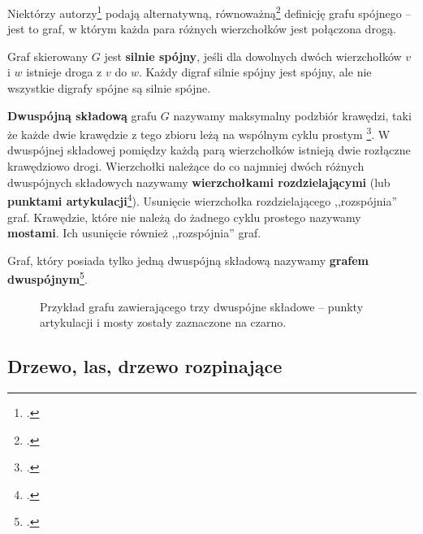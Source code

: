 Niektórzy autorzy\footcite[342]{ross} podają alternatywną, równoważną\footcite[42]{wilson} definicję grafu spójnego -- jest to graf, w którym każda para różnych wierzchołków jest połączona drogą. 

Graf skierowany $G$ jest \textbf{silnie spójny}, jeśli dla dowolnych dwóch wierzchołków $v$ i $w$ istnieje droga z $v$ do $w$. Każdy digraf silnie spójny jest spójny, ale nie wszystkie digrafy spójne są silnie spójne. 

\textbf{Dwuspójną składową} grafu $G$ nazywamy maksymalny podzbiór krawędzi, taki że każde dwie krawędzie z tego zbioru leżą na wspólnym cyklu prostym \footcite[634]{cormen}. W dwuspójnej składowej pomiędzy każdą parą wierzchołków istnieją dwie rozłączne krawędziowo drogi. Wierzchołki należące do co najmniej dwóch różnych dwuspójnych składowych nazywamy \textbf{wierzchołkami rozdzielającymi} (lub \textbf{punktami artykulacji}\footcite[633]{cormen}). Usunięcie wierzchołka rozdzielającego ,,rozspójnia'' graf. Krawędzie, które nie należą do żadnego cyklu prostego nazywamy \textbf{mostami}. Ich usunięcie również ,,rozspójnia'' graf.

Graf, który posiada tylko jedną dwuspójną składową nazywamy \textbf{grafem dwuspójnym}\footcite[232]{banachowski}.

\begin{figure}[h]
\centering
{}
\captionsetup{justification=centering}
\caption{Przykład grafu zawierającego trzy dwuspójne składowe -- punkty artykulacji i mosty zostały zaznaczone na czarno.} \label{fig:biconnected-copoments-example}
\end{figure}

\subsection*{Drzewo, las, drzewo rozpinające}

